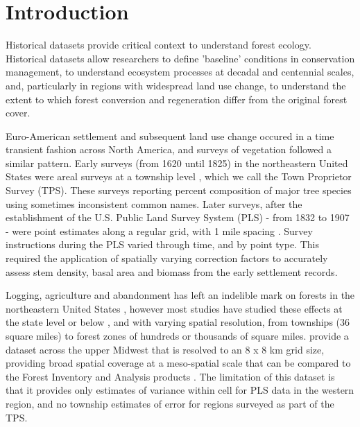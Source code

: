\documentclass[12pt]{article}\usepackage[]{graphicx}\usepackage[]{color}
\begin{document}
\section{Introduction}

Historical datasets provide critical context to understand forest
ecology. Historical datasets allow researchers to define 'baseline'
conditions in conservation management, to understand ecosystem processes
at decadal and centennial scales, and, particularly in regions with
widespread land use change, to understand the extent to which forest
conversion and regeneration differ from the original forest cover.

Euro-American settlement and subsequent land use change occured in
a time transient fashion across North America, and surveys of vegetation
followed a similar pattern. Early surveys (from 1620 until 1825) in
the northeastern United States were areal surveys at a township level
\citep{cogbill2002forests,thompson2013four}, which we call the Town
Proprietor Survey (TPS). These surveys reporting percent composition
of major tree species using sometimes inconsistent common names. Later
surveys, after the establishment of the U.S. Public Land Survey System
(PLS) - from 1832 to 1907 - were point estimates along a regular grid,
with 1 mile spacing \citep{schulte2001original,bourdo1956review,goring2015composition}.
Survey instructions during the PLS varied through time, and by point
type. This required the application of spatially varying correction
factors \citep{cogbill2015corrections,goring2015composition} to accurately
assess stem density, basal area and biomass from the early settlement
records.

Logging, agriculture and abandonment has left an indelible mark on
forests in the northeastern United States \citep{foster1998land,goring2015composition,rhemtulla2009legacies,thompson2013four},
however most studies have studied these effects at the state level
or below \citep{rhemtulla2009historical,friedman2005regional}, and
with varying spatial resolution, from townships (36 square miles)
to forest zones of hundreds or thousands of square miles. \citet{goring2015composition}
provide a dataset across the upper Midwest that is resolved to an
8 x 8 km grid size, providing broad spatial coverage at a meso-spatial
scale that can be compared to the Forest Inventory and Analysis products
\citet{gray2012forest}. The limitation of this dataset is that it
provides only estimates of variance within cell for PLS data in the
western region, and no township estimates of error for regions surveyed
as part of the TPS.
\end{document}
